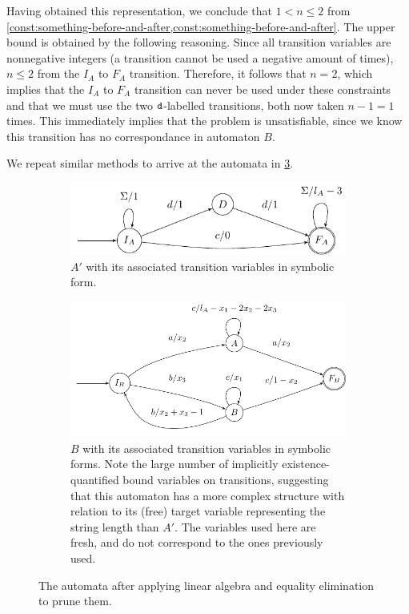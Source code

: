 Having obtained this representation, we conclude that $1 < n \leq 2$ from
\cref{const:something-before-and-after,const:something-before-and-after}. The
upper bound is obtained by the following reasoning. Since all transition
variables are nonnegative integers (a transition cannot be used a negative
amount of times), $n \leq 2$ from the $I_A$ to $F_A$ transition. Therefore, it
follows that $n=2$, which implies that the $I_A$ to $F_A$ transition can never
be used under these constraints and that we must use the two $\texttt{d}$-labelled
transitions, both now taken $n-1 =1$ times. This immediately implies that the problem is
unsatisfiable, since we know this transition has no correspondance in automaton
$B$.

We repeat similar methods to arrive at the automata in \cref{fig:propagated}.

\begin{figure}[h]
    \centering 
  \begin{subfigure}[b]{\autscale\textwidth}
    \centering
    \includegraphics[width=\textwidth]{a_annotated}
    \caption{ $A'$ with its associated transition variables in symbolic
    form.}\label{fig:aut_a_annotated}
  \end{subfigure}\hfill%
  \begin{subfigure}[b]{\autscale\textwidth}
    \centering
    \includegraphics[width=\textwidth]{b_annotated}
    \caption{$B$ with its associated transition variables in symbolic forms.
    Note the large number of implicitly existence-quantified bound variables on
    transitions, suggesting that this automaton has a more complex structure
    with relation to its (free) target variable representing the string length
    than $A'$. The variables used here are fresh, and do not correspond to the
    ones previously used.}\label{fig:aut_b_annotated}
  \end{subfigure}
  \caption{The automata after applying linear algebra and equality elimination
  to prune them.}\label{fig:propagated}
\end{figure}


